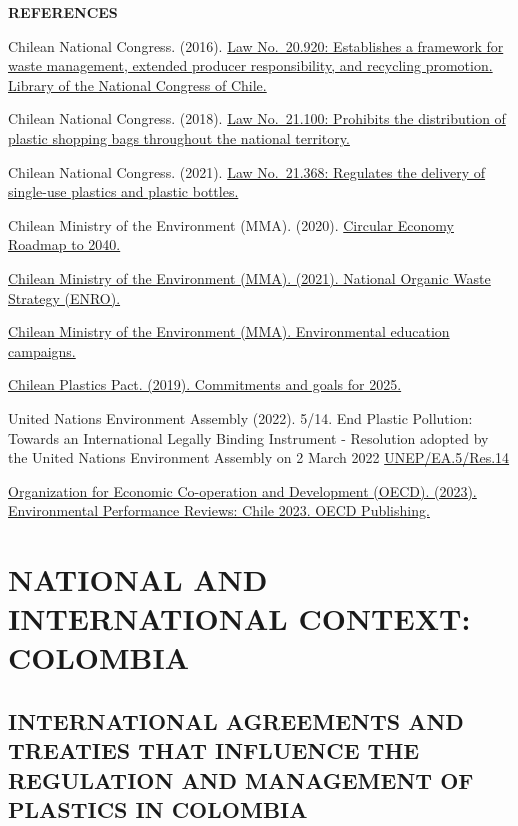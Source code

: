 \documentclass[
  12pt,
  oneside]{book}
\begin{document}
\textbf{REFERENCES}

Chilean National Congress. (2016).
\href{https://www.bcn.cl/leychile/navegar?idNorma=1090894&idParte=9705129&idVersion=2016-06-01}{Law
No.~20.920: Establishes a framework for waste management, extended
producer responsibility, and recycling promotion. Library of the
National Congress of Chile.}

Chilean National Congress. (2018).
\href{https://www.bcn.cl/leychile/navegar?idNorma=1121380&buscar=21100}{Law
No.~21.100: Prohibits the distribution of plastic shopping bags
throughout the national territory.}

Chilean National Congress. (2021).
\href{https://www.bcn.cl/leychile/navegar?idNorma=1163603&idVersion=2024-08-12&idParte=10259809}{Law
No.~21.368: Regulates the delivery of single-use plastics and plastic
bottles.}

Chilean Ministry of the Environment (MMA). (2020).
\href{https://economiacircular.mma.gob.cl/hoja-de-ruta/}{Circular
Economy Roadmap to 2040.}

\href{https://cambioclimatico.mma.gob.cl/wp-content/uploads/2025/01/12-Estrategia-Nacional-de-Residuos-Organicos.pdf}{Chilean
Ministry of the Environment (MMA). (2021). National Organic Waste
Strategy (ENRO).}

\href{https://mma.gob.cl/educacion-ambiental/}{Chilean Ministry of the
Environment (MMA). Environmental education campaigns.}

\href{https://pactodelosplasticos.cl/}{Chilean Plastics Pact. (2019).
Commitments and goals for 2025.}

United Nations Environment Assembly (2022). 5/14. End Plastic Pollution:
Towards an International Legally Binding Instrument - Resolution adopted
by the United Nations Environment Assembly on 2 March 2022
\href{https://wedocs.unep.org/20.500.11822/40597.}{UNEP/EA.5/Res.14}

\href{https://www.oecd.org/environment/country-reviews/environmental-performance-reviews-chile.htm}{Organization
for Economic Co-operation and Development (OECD). (2023). Environmental
Performance Reviews: Chile 2023. OECD Publishing.}

\chapter{NATIONAL AND INTERNATIONAL CONTEXT:
COLOMBIA}\label{sec-colombia}

\section{INTERNATIONAL AGREEMENTS AND TREATIES THAT INFLUENCE THE
REGULATION AND MANAGEMENT OF PLASTICS IN
COLOMBIA}\label{international-agreements-and-treaties-that-influence-the-regulation-and-management-of-plastics-in-colombia}
\end{document}
